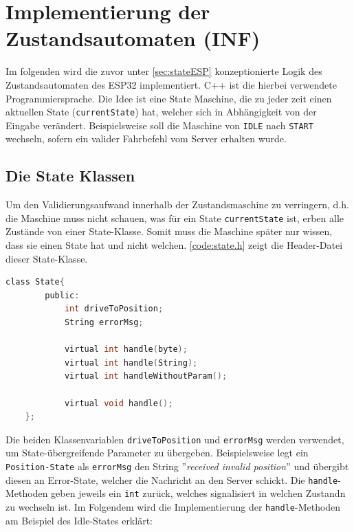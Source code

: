 \chapter{Implementierung der Zustandsautomaten (INF)}
Im folgenden wird die zuvor unter \autoref{sec:stateESP} konzeptionierte Logik des Zustandsautomaten des ESP32 implementiert.
C++ ist die hierbei verwendete Programmiersprache. Die Idee ist eine State Maschine, die zu jeder zeit einen aktuellen State (\texttt{currentState}) hat, welcher sich in Abhängigkeit von der Eingabe verändert. Beispielsweise soll die Maschine von \texttt{IDLE} nach \texttt{START} wechseln, sofern ein valider Fahrbefehl vom Server erhalten wurde.

\section{Die State Klassen}
Um den Validierungsaufwand innerhalb der Zustandsmaschine zu verringern, d.h. die Maschine muss nicht schauen, was für ein State \texttt{currentState} ist, erben alle Zustände von einer State-Klasse. Somit muss die Maschine später nur wissen, dass sie einen State hat und nicht welchen.
\autoref{code:state.h} zeigt die Header-Datei dieser State-Klasse.
\newpage
\begin{lstlisting}[language=c, style=dhpaperdefault]
	class State{
		public:
			int driveToPosition;
			String errorMsg;

			virtual int handle(byte);
			virtual int handle(String);
			virtual int handleWithoutParam();
			
			virtual void handle();
	};
\end{lstlisting}

Die beiden Klassenvariablen \texttt{driveToPosition} und \texttt{errorMsg} werden verwendet, um State-übergreifende Parameter zu übergeben. Beispielsweise legt ein \texttt{Position-State} als \texttt{errorMsg} den String ''\textit{received invalid position}'' und übergibt diesen an Error-State, welcher die Nachricht an den Server schickt.
Die \texttt{handle}-Methoden geben jeweils ein \texttt{int} zurück, welches signalisiert in welchen Zustandn zu wechseln ist.
Im Folgendem wird die Implementierung der \texttt{handle}-Methoden am Beispiel des Idle-States erklärt:

